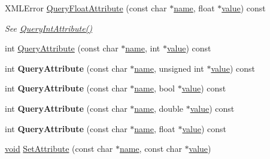 \begin{DoxyCompactItemize}
\mbox{\label{classtinyxml2_1_1_x_m_l_element_acd5eeddf6002ef90806af794b9d9a5a5}} 
X\+M\+L\+Error \hyperlink{classtinyxml2_1_1_x_m_l_element_acd5eeddf6002ef90806af794b9d9a5a5}{Query\+Float\+Attribute} (const char $\ast$\hyperlink{structname}{name}, float $\ast$\hyperlink{unionvalue}{value}) const
\begin{DoxyCompactList}\small\item\em See \hyperlink{classtinyxml2_1_1_x_m_l_element_a8a78bc1187c1c45ad89f2690eab567b1}{Query\+Int\+Attribute()} \end{DoxyCompactList}\item 
int \hyperlink{classtinyxml2_1_1_x_m_l_element_a042fc30504347b84a56cf863ad528a4f}{Query\+Attribute} (const char $\ast$\hyperlink{structname}{name}, int $\ast$\hyperlink{unionvalue}{value}) const
\item 
\mbox{\label{classtinyxml2_1_1_x_m_l_element_a187e8b686fbe071732aea2e2ee766f86}} 
int {\bfseries Query\+Attribute} (const char $\ast$\hyperlink{structname}{name}, unsigned int $\ast$\hyperlink{unionvalue}{value}) const
\item 
\mbox{\label{classtinyxml2_1_1_x_m_l_element_a9aa67feb0392ead13a66f5ea55e71f64}} 
int {\bfseries Query\+Attribute} (const char $\ast$\hyperlink{structname}{name}, bool $\ast$\hyperlink{unionvalue}{value}) const
\item 
\mbox{\label{classtinyxml2_1_1_x_m_l_element_a7f37582f3ad9f9a765e6fa349dfbdfa0}} 
int {\bfseries Query\+Attribute} (const char $\ast$\hyperlink{structname}{name}, double $\ast$\hyperlink{unionvalue}{value}) const
\item 
\mbox{\label{classtinyxml2_1_1_x_m_l_element_a493b6dace830e4dba7110b1e9f6bebd5}} 
int {\bfseries Query\+Attribute} (const char $\ast$\hyperlink{structname}{name}, float $\ast$\hyperlink{unionvalue}{value}) const
\item 
\mbox{\label{classtinyxml2_1_1_x_m_l_element_a11943abf2d0831548c3790dd5d9f119c}} 
\hyperlink{interfacevoid}{void} \hyperlink{classtinyxml2_1_1_x_m_l_element_a11943abf2d0831548c3790dd5d9f119c}{Set\+Attribute} (const char $\ast$\hyperlink{structname}{name}, const char $\ast$\hyperlink{unionvalue}{value})

\end{DoxyCompactItemize}
